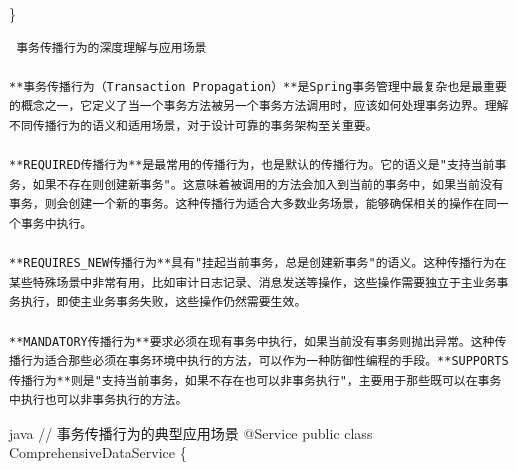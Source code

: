\}

\begin{lstlisting}
 事务传播行为的深度理解与应用场景

**事务传播行为（Transaction Propagation）**是Spring事务管理中最复杂也是最重要的概念之一，它定义了当一个事务方法被另一个事务方法调用时，应该如何处理事务边界。理解不同传播行为的语义和适用场景，对于设计可靠的事务架构至关重要。

**REQUIRED传播行为**是最常用的传播行为，也是默认的传播行为。它的语义是"支持当前事务，如果不存在则创建新事务"。这意味着被调用的方法会加入到当前的事务中，如果当前没有事务，则会创建一个新的事务。这种传播行为适合大多数业务场景，能够确保相关的操作在同一个事务中执行。

**REQUIRES_NEW传播行为**具有"挂起当前事务，总是创建新事务"的语义。这种传播行为在某些特殊场景中非常有用，比如审计日志记录、消息发送等操作，这些操作需要独立于主业务事务执行，即使主业务事务失败，这些操作仍然需要生效。

**MANDATORY传播行为**要求必须在现有事务中执行，如果当前没有事务则抛出异常。这种传播行为适合那些必须在事务环境中执行的方法，可以作为一种防御性编程的手段。**SUPPORTS传播行为**则是"支持当前事务，如果不存在也可以非事务执行"，主要用于那些既可以在事务中执行也可以非事务执行的方法。
\end{lstlisting}

java // 事务传播行为的典型应用场景 @Service public class ComprehensiveDataService \{

